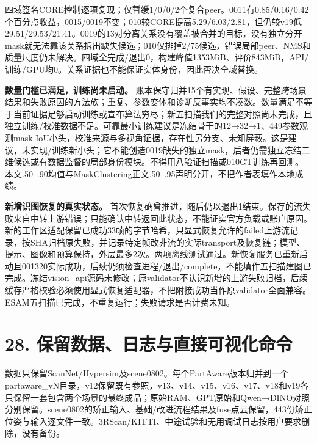 \documentclass[UTF8,fontset=fandol]{ctexart}
\begin{document}
四域签名CORE控制逐项复现；仅暂缓1/0/0/2个复合peer。0011有0.85/0.16/0.42个百分点收益，0015/0019不变；010较CORE提高5.29/6.03/2.81，但仍较v19低29.51/29.53/21.41。0019的13对分离关系没有覆盖被合并的目标，没有独立分开mask就无法靠该关系拆出缺失候选；010仅排掉2/75候选，错误局部peer、NMS和质量尺度仍未解决。四域全完成/退出0，构建峰值1353MiB、评价843MiB，API/训练/GPU均0。关系证据也不能保证实体身份，因此否决全域替换。



\textbf{数量门槛已满足，训练尚未启动。} 账本保守归并15个有实现、假设、完整跨场景结果和失败原因的方法族；重复、参数变体和诊断反事实均不凑数。数量满足不等于当前证据足够启动训练或宣布算法穷尽；新五扫描我们的完整对照尚未完成，且独立训练/校准数据不足。可靠最小训练建议是冻结骨干的12→32→1、449参数观测mask-IoU小头，校准来源与多视角证据，存在性另分支、未知屏蔽。这是建议，未实现/训练新小头；它不能创造0019缺失的独立mask，后者仍需独立冻结二维候选或有数据监督的局部身份模块。不得用八验证扫描或010GT训练再回测。本文.50–.90均值与MaskClustering正文.50–.95声明分开，不把作者表填作本地成绩。



\textbf{新增识图恢复的真实状态。} 首次恢复确曾推进，随后仍以退出1结束。保存的流失败来自中转上游错误；只能确认中转返回此状态，不能证实官方负载或账户原因。新的工作区适配保留已成功33帧的字节哈希，只显式恢复允许的failed上游流记录，按SHA归档原失败，并记录特定帧改非流的实际transport及恢复链；模型、提示、图像和预算保持，外层最多2次。两项离线测试通过。新恢复服务已重新启动且001320实际成功，后续仍须检查进程/退出/complete，不能填作五扫描建图已完成。冻结vision\_api源码未修改；原validator不认识新增的上游失败归档，后续缓存严格校验必须使用显式恢复适配器，不把附接成功当作原validator全面兼容。ESAM五扫描已完成，不重复运行；失败请求是否计费未知。



\section*{28. 保留数据、日志与直接可视化命令}

数据只保留ScanNet/Hypersim及scene0802。每个PartAware版本归并到一个partaware\_vN目录，v12保留既有参照，v13、v14、v15、v16、v17、v18和v19各只保留一套包含两个场景的最终成品；原始RAM、GPT原始和Qwen→DINO对照分别保留。scene0802的矫正输入、基础/改进流程结果及fuse点云保留，443份矫正位姿与输入逐文件一致。3RScan/KITTI、中途试验和无用调试日志按用户要求删除，没有备份。
\end{document}
